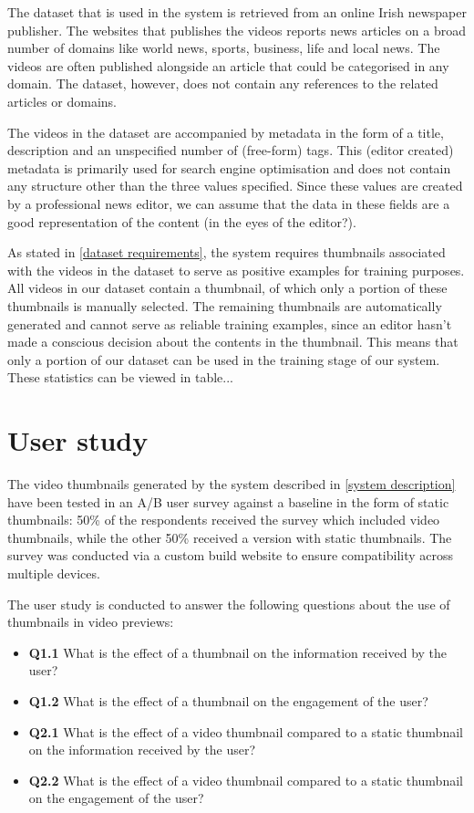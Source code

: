 \documentclass{../resources/sig-alternate-05-2015}
\begin{document}
The dataset that is used in the system is retrieved from an online Irish newspaper publisher. The websites that publishes the videos reports news articles on a broad number of domains like world news, sports, business, life and local news. The videos are often published alongside an article that could be categorised in any domain. The dataset, however, does not contain any references to the related articles or domains.

The videos in the dataset are accompanied by metadata in the form of a title, description and an unspecified number of (free-form) tags. This (editor created) metadata is primarily used for search engine optimisation and does not contain any structure other than the three values specified. Since these values are created by a professional news editor, we can assume that the data in these fields are a good representation of the content (in the eyes of the editor?).

As stated in \ref{dataset requirements}, the system requires thumbnails associated with the videos in the dataset to serve as positive examples for training purposes. All videos in our dataset contain a thumbnail, of which only a portion of these thumbnails is manually selected. The remaining thumbnails are automatically generated and cannot serve as reliable training examples, since an editor hasn't made a conscious decision about the contents in the thumbnail. This means that only a portion of our dataset can be used in the training stage of our system. These statistics can be viewed in table...


\section{User study}
\label{user study}

The video thumbnails generated by the system described in \ref{system description} have been tested in an A/B user survey against a baseline in the form of static thumbnails: 50\% of the respondents received the survey which included video thumbnails, while the other 50\% received a version with static thumbnails. The survey was conducted via a custom build website to ensure compatibility across multiple devices.

The user study is conducted to answer the following questions about the use of thumbnails in video previews:

\begin{itemize}
	\item \textbf{Q1.1} What is the effect of a thumbnail on the information received by the user?
	\item \textbf{Q1.2} What is the effect of a thumbnail on the engagement of the user?
	\item \textbf{Q2.1} What is the effect of a video thumbnail compared to a static thumbnail on the information received by the user?
	\item \textbf{Q2.2} What is the effect of a video thumbnail compared to a static thumbnail on the engagement of the user?
\end{itemize}
\end{document}
